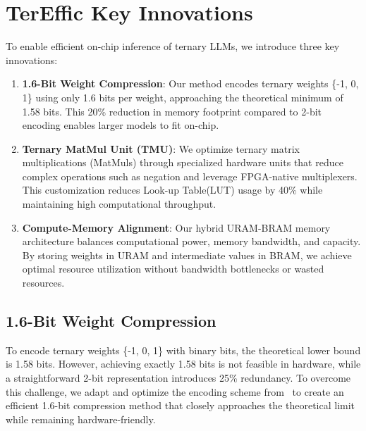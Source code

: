 \section{TerEffic Key Innovations}
To enable efficient on-chip inference of ternary LLMs, we introduce three key innovations:
\begin{enumerate}
\item \textbf{1.6-Bit Weight Compression}: Our method encodes ternary weights \{-1, 0, 1\} using only 1.6 bits per weight, approaching the theoretical minimum of 1.58 bits. This 20\% reduction in memory footprint compared to 2-bit encoding enables larger models to fit on-chip.
\item \textbf{Ternary MatMul Unit (TMU)}: We optimize ternary matrix multiplications (MatMuls) through specialized hardware units that reduce complex operations such as negation and leverage FPGA-native multiplexers. This customization reduces Look-up Table(LUT) usage by 40\% while maintaining high computational throughput.
\item \textbf{Compute-Memory Alignment}: Our hybrid URAM-BRAM memory architecture balances computational power, memory bandwidth, and capacity. By storing weights in URAM and intermediate values in BRAM, we achieve optimal resource utilization without bandwidth bottlenecks or wasted resources.
\end{enumerate}

\subsection{1.6-Bit Weight Compression}
\label{1.6bit}
\vspace{-0.5mm}
To encode ternary weights \{-1, 0, 1\} with binary bits, the theoretical lower bound is 1.58 bits\cite{bitnet1.58}. However, achieving exactly 1.58 bits is not feasible in hardware, while a straightforward 2-bit representation introduces 25\% redundancy. To overcome this challenge, we adapt and optimize the encoding scheme from~\cite{ternaryencoding} to create an efficient 1.6-bit compression method that closely approaches the theoretical limit while remaining hardware-friendly.

